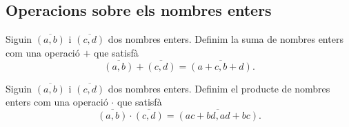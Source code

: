 \documentclass[../Apunts.tex]{subfiles}
\begin{document}
	\subsection{Operacions sobre els nombres enters} %
	\begin{definition}
		\label{def:suma de nombres enters}
		Siguin \(\overline{(a,b)}\) i \(\overline{(c,d)}\) dos nombres enters. Definim la suma de nombres enters com una operació \(+\) que satisfà
		\[\overline{(a,b)}+\overline{(c,d)}=\overline{(a+c,b+d)}.\]
	\end{definition}
	\begin{definition}
		\label{def:producte de nombres enters}
		Siguin \(\overline{(a,b)}\) i \(\overline{(c,d)}\) dos nombres enters. Definim el producte de nombres enters com una operació \(\cdot\) que satisfà
		\[\overline{(a,b)}\cdot\overline{(c,d)}=\overline{(ac+bd,ad+bc)}.\]
	\end{definition}
\end{document}
